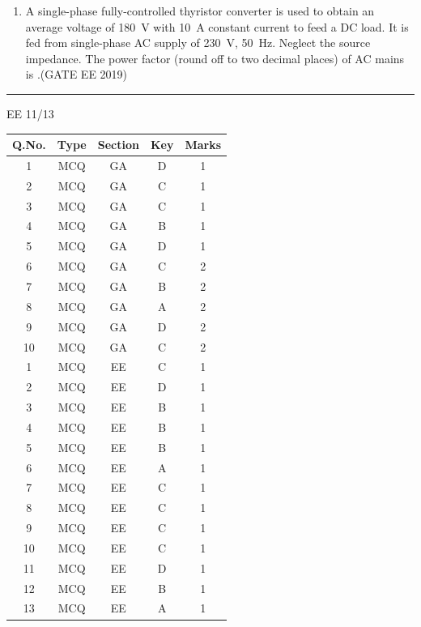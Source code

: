 \documentclass[a4paper,10pt]{exam}
\theoremstyle{remark}
\begin{document}
\begin{enumerate}
\begin{enumerate}[label=\arabic*.]
    \item A single-phase fully-controlled thyristor converter is used to obtain an average voltage of 180~V with 10~A constant current to feed a DC load. It is fed from single-phase AC supply of 230~V, 50~Hz. Neglect the source impedance. The power factor (round off to two decimal places) of AC mains is \underline{\hspace{2cm}}.\hfill{(GATE EE 2019)}
    \end{enumerate}
\vfill
\noindent\rule{\linewidth}{0.4pt}
EE \hfill 11/13
\newpage
    \begin{table}[ht]
\centering
\renewcommand{\arraystretch}{2}
\begin{tabular}{|c|c|c|c|c|}
\hline
\textbf{Q.No.} & \textbf{Type} & \textbf{Section} & \textbf{Key} & \textbf{Marks} \\
\hline
1  & MCQ & GA & D & 1 \\
2  & MCQ & GA & C & 1 \\
3  & MCQ & GA & C & 1 \\
4  & MCQ & GA & B & 1 \\
5  & MCQ & GA & D & 1 \\
6  & MCQ & GA & C & 2 \\
7  & MCQ & GA & B & 2 \\
8  & MCQ & GA & A & 2 \\
9  & MCQ & GA & D & 2 \\
10 & MCQ & GA & C & 2 \\
\hline
1  & MCQ & EE & C & 1 \\
2  & MCQ & EE & D & 1 \\
3  & MCQ & EE & B & 1 \\
4  & MCQ & EE & B & 1 \\
5  & MCQ & EE & B & 1 \\
6  & MCQ & EE & A & 1 \\
7  & MCQ & EE & C & 1 \\
8  & MCQ & EE & C & 1 \\
9  & MCQ & EE & C & 1 \\
10 & MCQ & EE & C & 1 \\
11 & MCQ & EE & D & 1 \\
12 & MCQ & EE & B & 1 \\
13 & MCQ & EE & A & 1 \\
\hline
\end{tabular}
\end{table}
\newpage
\begin{table}[ht]
\centering
\renewcommand{\arraystretch}{2}
\begin{tabular}{|c|c|c|l|c|}

\end{tabular}
\end{table}
\end{enumerate}
\end{document}
